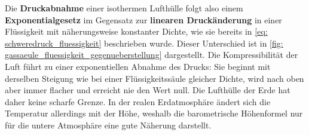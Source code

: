 Die \textbf{Druckabnahme} einer isothermen Lufthülle folgt also einem \textbf{Exponentialgesetz} im Gegensatz zur \textbf{linearen Druckänderung} in einer Flüssigkeit mit näherungsweise konstanter Dichte, wie sie bereits in \cref{eq: schweredruck_fluessigkeit} beschrieben wurde. Dieser Unterschied ist in \cref{fig: gassaeule_fluessigkeit_gegenueberstellung} dargestellt. Die Kompressibilität der Luft führt zu einer exponentiellen Abnahme des Drucks: Sie beginnt mit derselben Steigung wie bei einer Flüssigkeitssäule gleicher Dichte, wird nach oben aber immer flacher und erreicht nie den Wert null. Die Lufthülle der Erde hat daher keine scharfe Grenze. In der realen Erdatmosphäre ändert sich die Temperatur allerdings mit der Höhe, weshalb die barometrische Höhenformel nur für die untere Atmosphäre eine gute Näherung darstellt. 

